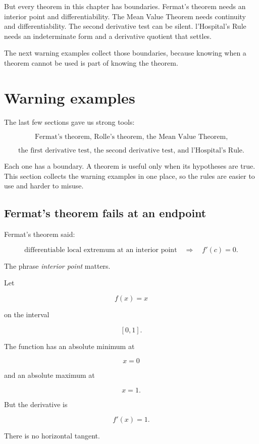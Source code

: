 But every theorem in this chapter has boundaries.  Fermat's theorem needs an interior
point and differentiability.  The Mean Value Theorem needs continuity and
differentiability.  The second derivative test can be silent.  l'Hospital's Rule needs an
indeterminate form and a derivative quotient that settles.

The next warning examples collect those boundaries, because knowing when a theorem
cannot be used is part of knowing the theorem.
\section{Warning examples}
\label{sec:warning-examples-chapter-6}

The last few sections gave us strong tools:

\[
\text{Fermat's theorem, Rolle's theorem, the Mean Value Theorem,}
\]

\[
\text{the first derivative test, the second derivative test, and l'Hospital's Rule.}
\]

Each one has a boundary.  A theorem is useful only when its hypotheses are true.
This section collects the warning examples in one place, so the rules are easier to use
and harder to misuse.

\subsection{Fermat's theorem fails at an endpoint}
\label{subsec:fermat-endpoint-warning}

Fermat's theorem said:

\[
\text{differentiable local extremum at an interior point}
\quad\Longrightarrow\quad
f'(c)=0.
\]

The phrase \emph{interior point} matters.

Let

\[
f(x)=x
\]

on the interval

\[
[0,1].
\]

The function has an absolute minimum at

\[
x=0
\]

and an absolute maximum at

\[
x=1.
\]

But the derivative is

\[
f'(x)=1.
\]

There is no horizontal tangent.

